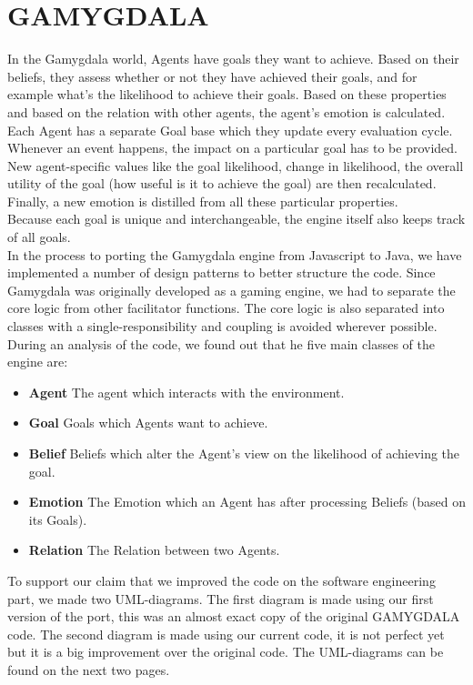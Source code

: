 \section{GAMYGDALA}
In the Gamygdala world, Agents have goals they want to achieve. Based on their beliefs, they assess whether or not they have achieved their goals, and for example what's the likelihood to achieve their goals. Based on these properties and based on the relation with other agents, the agent's emotion is calculated. \\ 

Each Agent has a separate Goal base which they update every evaluation cycle. Whenever an event happens, the impact on a particular goal has to be provided. New agent-specific values like the goal likelihood, change in likelihood, the overall utility of the goal (how useful is it to achieve the goal) are then recalculated. Finally, a new emotion is distilled from all these particular properties. \\

Because each goal is unique and interchangeable, the engine itself also keeps track of all goals. \\

In the process to porting the Gamygdala engine from Javascript to Java, we have implemented a number of design patterns to better structure the code. Since Gamygdala was originally developed as a gaming engine, we had to separate the core logic from other facilitator functions. The core logic is also separated into classes with a single-responsibility and coupling is avoided wherever possible. \\

During an analysis of the code, we found out that he five main classes of the engine are:
\begin{itemize}
	\item \textbf{Agent} The agent which interacts with the environment.
	\item \textbf{Goal} Goals which Agents want to achieve.
	\item \textbf{Belief} Beliefs which alter the Agent's view on the likelihood of achieving the goal.
	\item \textbf{Emotion} The Emotion which an Agent has after processing Beliefs (based on its Goals).
	\item \textbf{Relation} The Relation between two Agents.
\end{itemize}

To support our claim that we improved the code on the software engineering part, we made two UML-diagrams. The first diagram is made using our first version of the port, this was an almost exact copy of the original GAMYGDALA code. The second diagram is made using our current code, it is not perfect yet but it is a big improvement over the original code. The UML-diagrams can be found on the next two pages.\\

